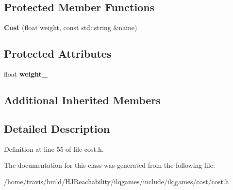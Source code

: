 \subsection*{Protected Member Functions}
\begin{DoxyCompactItemize}
\item 
{\bfseries Cost} (float weight, const std\+::string \&name)\hypertarget{classilqgames_1_1_cost_aa12ced188907eefb55bfd82d99ae998b}{}\label{classilqgames_1_1_cost_aa12ced188907eefb55bfd82d99ae998b}

\end{DoxyCompactItemize}
\subsection*{Protected Attributes}
\begin{DoxyCompactItemize}
\item 
float {\bfseries weight\+\_\+}\hypertarget{classilqgames_1_1_cost_a03c98f733c0e722960dad9e80e235652}{}\label{classilqgames_1_1_cost_a03c98f733c0e722960dad9e80e235652}

\end{DoxyCompactItemize}
\subsection*{Additional Inherited Members}


\subsection{Detailed Description}


Definition at line 55 of file cost.\+h.



The documentation for this class was generated from the following file\+:\begin{DoxyCompactItemize}
\item 
/home/travis/build/\+H\+J\+Reachability/ilqgames/include/ilqgames/cost/cost.\+h\end{DoxyCompactItemize}
